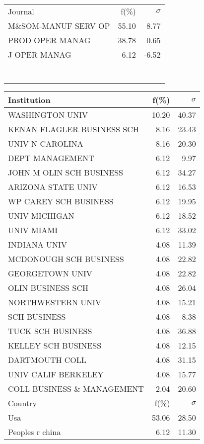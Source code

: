 \documentclass[a4paper,11pt]{report}
\begin{document}
\begin{landscape}
\begin{table}[!ht]
{\begin{tabular}{|l r  r|}
 &  & \\
\hline
\hline
Journal & f(\%) & $\sigma$\\
\hline
M\&SOM-MANUF SERV OP & 55.10 & 8.77\\
PROD OPER MANAG & 38.78 & 0.65\\
J OPER MANAG & 6.12 & -6.52\\
 &  & \\
 &  & \\
 &  & \\
 &  & \\
 &  & \\
 &  & \\
 &  & \\
\hline
\end{tabular}
}
{\scriptsize\begin{tabular}{|l r r|}
\hline
Institution & f(\%) & $\sigma$\\
\hline
WASHINGTON UNIV & 10.20 & 40.37\\
KENAN FLAGLER BUSINESS SCH & 8.16 & 23.43\\
UNIV N CAROLINA & 8.16 & 20.30\\
DEPT MANAGEMENT & 6.12 & 9.97\\
JOHN M OLIN SCH BUSINESS & 6.12 & 34.27\\
ARIZONA STATE UNIV & 6.12 & 16.53\\
WP CAREY SCH BUSINESS & 6.12 & 19.95\\
UNIV MICHIGAN & 6.12 & 18.52\\
UNIV MIAMI & 6.12 & 33.02\\
INDIANA UNIV & 4.08 & 11.39\\
MCDONOUGH SCH BUSINESS & 4.08 & 22.82\\
GEORGETOWN UNIV & 4.08 & 22.82\\
OLIN BUSINESS SCH & 4.08 & 26.04\\
NORTHWESTERN UNIV & 4.08 & 15.21\\
SCH BUSINESS & 4.08 & 8.38\\
TUCK SCH BUSINESS & 4.08 & 36.88\\
KELLEY SCH BUSINESS & 4.08 & 12.15\\
DARTMOUTH COLL & 4.08 & 31.15\\
UNIV CALIF BERKELEY & 4.08 & 15.77\\
COLL BUSINESS \& MANAGEMENT & 2.04 & 20.60\\
\hline
\hline
Country & f(\%) & $\sigma$\\
\hline
Usa & 53.06 & 28.50\\
Peoples r china & 6.12 & 11.30\\

\end{tabular}}
\end{table}
\end{landscape}
\end{document}
